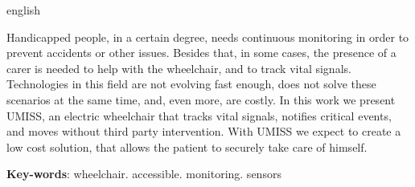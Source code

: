 \begin{resumo}[Abstract]
\begin{otherlanguage*}{english}

Handicapped people, in a certain degree, needs continuous monitoring in
order to prevent accidents or other issues. Besides that, in some cases, the
presence of a carer is needed to help with the wheelchair, and to track vital
signals.
Technologies in this field are not evolving fast enough, does not solve
these scenarios at the same time, and, even more, are costly.
In this work we present UMISS, an electric wheelchair that tracks vital
signals, notifies critical events, and moves without third party intervention.
With UMISS we expect to create a low cost solution, that allows the
patient to securely take care of himself.


   \vspace{\onelineskip}
   \noindent 
   \textbf{Key-words}: wheelchair. accessible. monitoring. sensors
 \end{otherlanguage*}
\end{resumo}
